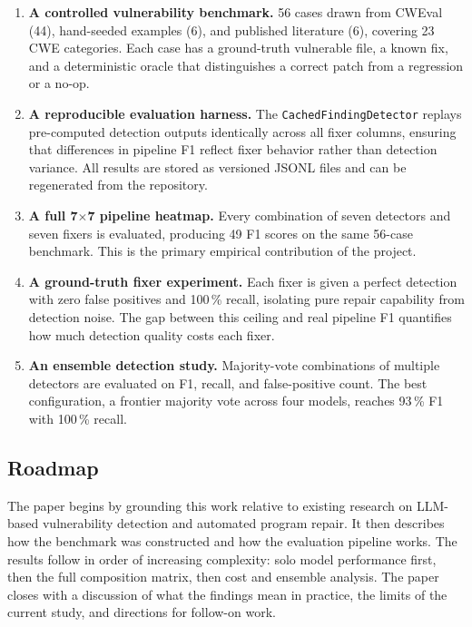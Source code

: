 \documentclass[12pt]{article}
\begin{document}
\begin{enumerate}[leftmargin=*, label=\arabic*.]

  \item \textbf{A controlled vulnerability benchmark.} 56 cases drawn from
  CWEval (44), hand-seeded examples (6), and published literature (6), covering
  23 CWE categories. Each case has a ground-truth vulnerable file, a known fix,
  and a deterministic oracle that distinguishes a correct patch from a
  regression or a no-op.

  \item \textbf{A reproducible evaluation harness.} The
  \texttt{CachedFindingDetector} replays pre-computed detection outputs
  identically across all fixer columns, ensuring that differences in pipeline
  F1 reflect fixer behavior rather than detection variance. All results are
  stored as versioned JSONL files and can be regenerated from the repository.

  \item \textbf{A full 7$\times$7 pipeline heatmap.} Every combination of
  seven detectors and seven fixers is evaluated, producing 49 F1 scores on the
  same 56-case benchmark. This is the primary empirical contribution of the
  project.

  \item \textbf{A ground-truth fixer experiment.} Each fixer is given a
  perfect detection with zero false positives and 100\,\% recall, isolating
  pure repair capability from detection noise. The gap between this ceiling and
  real pipeline F1 quantifies how much detection quality costs each fixer.

  \item \textbf{An ensemble detection study.} Majority-vote combinations of
  multiple detectors are evaluated on F1, recall, and false-positive count.
  The best configuration, a frontier majority vote across four models, reaches
  93\,\% F1 with 100\,\% recall.

\end{enumerate}

\subsection{Roadmap}

The paper begins by grounding this work relative to existing research on
LLM-based vulnerability detection and automated program repair. It then
describes how the benchmark was constructed and how the evaluation pipeline
works. The results follow in order of increasing complexity: solo model
performance first, then the full composition matrix, then cost and ensemble
analysis. The paper closes with a discussion of what the findings mean in
practice, the limits of the current study, and directions for follow-on work.
\end{document}
